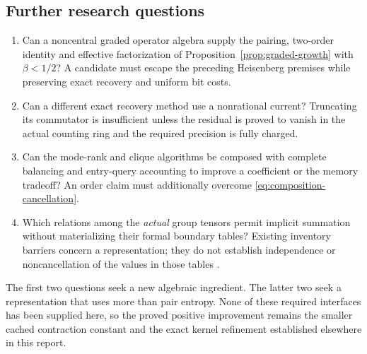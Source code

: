 \subsection{Further research questions}

\begin{enumerate}
\item Can a noncentral graded operator algebra supply the pairing,
two-order identity and effective factorization of
Proposition~\ref{prop:graded-growth} with $\beta<1/2$?  A candidate
must escape the preceding Heisenberg premises while preserving exact
recovery and uniform bit costs.
\item Can a different exact recovery method use a nonrational current?
Truncating its commutator is insufficient unless the residual is proved
to vanish in the actual counting ring and the required precision is
fully charged.
\item Can the mode-rank and clique algorithms be composed with complete
balancing and entry-query accounting to improve a coefficient or the
memory tradeoff?  An order claim must additionally overcome
\eqref{eq:composition-cancellation}.
\item Which relations among the \emph{actual} group tensors permit
implicit summation without materializing their formal boundary tables?
Existing inventory barriers concern a representation; they do not
establish independence or noncancellation of the values in those tables
\cite{precision,barriers}.
\end{enumerate}

The first two questions seek a new algebraic ingredient.  The latter
two seek a representation that uses more than pair entropy.  None of
these required interfaces has been supplied here, so the proved
positive improvement remains the smaller cached contraction constant
and the exact kernel refinement established elsewhere in this report.
